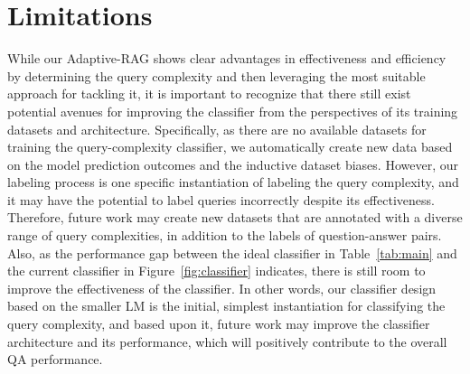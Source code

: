 \section*{Limitations}
While our Adaptive-RAG shows clear advantages in effectiveness and efficiency by determining the query complexity and then leveraging the most suitable approach for tackling it, it is important to recognize that there still exist potential avenues for improving the classifier from the perspectives of its training datasets and architecture. Specifically, as there are no available datasets for training the query-complexity classifier, we automatically create new data based on the model prediction outcomes and the inductive dataset biases. However, our labeling process is one specific instantiation of labeling the query complexity, and it may have the potential to label queries incorrectly despite its effectiveness. Therefore, future work may create new datasets that are annotated with a diverse range of query complexities, in addition to the labels of question-answer pairs. Also, as the performance gap between the ideal classifier in Table~\ref{tab:main} and the current classifier in Figure~\ref{fig:classifier} indicates, there is still room to improve the effectiveness of the classifier. In other words, our classifier design based on the smaller LM is the initial, simplest instantiation for classifying the query complexity, and based upon it, future work may improve the classifier architecture and its performance, which will positively contribute to the overall QA performance.
